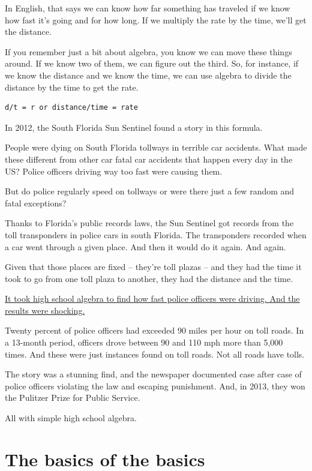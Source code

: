 \documentclass[]{book}
\begin{document}
In English, that says we can know how far something has traveled if we know how fast it's going and for how long. If we multiply the rate by the time, we'll get the distance.

If you remember just a bit about algebra, you know we can move these things around. If we know two of them, we can figure out the third. So, for instance, if we know the distance and we know the time, we can use algebra to divide the distance by the time to get the rate.

\begin{verbatim}
d/t = r or distance/time = rate
\end{verbatim}

In 2012, the South Florida Sun Sentinel found a story in this formula.

People were dying on South Florida tollways in terrible car accidents. What made these different from other car fatal car accidents that happen every day in the US? Police officers driving way too fast were causing them.

But do police regularly speed on tollways or were there just a few random and fatal exceptions?

Thanks to Florida's public records laws, the Sun Sentinel got records from the toll transponders in police cars in south Florida. The transponders recorded when a car went through a given place. And then it would do it again. And again.

Given that those places are fixed -- they're toll plazas -- and they had the time it took to go from one toll plaza to another, they had the distance and the time.

\href{http://www.sun-sentinel.com/news/local/speeding-cops/fl-speeding-cops-20120211,0,3706919.story}{It took high school algebra to find how fast police officers were driving. And the results were shocking.}

Twenty percent of police officers had exceeded 90 miles per hour on toll roads. In a 13-month period, officers drove between 90 and 110 mph more than 5,000 times. And these were just instances found on toll roads. Not all roads have tolls.

The story was a stunning find, and the newspaper documented case after case of police officers violating the law and escaping punishment. And, in 2013, they won the Pulitzer Prize for Public Service.

All with simple high school algebra.

\hypertarget{the-basics-of-the-basics}{%
\section{The basics of the basics}\label{the-basics-of-the-basics}}
\end{document}
